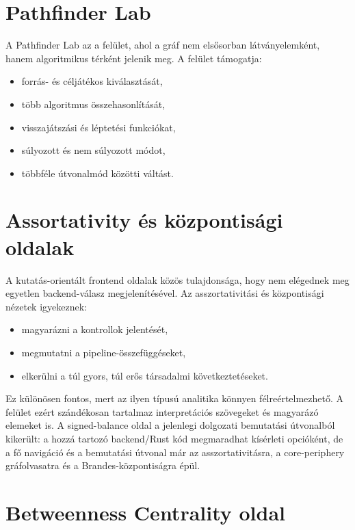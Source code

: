﻿\documentclass[a4paper,12pt]{report}
\begin{document}
\section{Pathfinder Lab}

A Pathfinder Lab az a felület, ahol a gráf nem elsősorban látványelemként, hanem algoritmikus térként jelenik meg. A felület támogatja:

\begin{itemize}
    \item forrás- és céljátékos kiválasztását,
    \item több algoritmus összehasonlítását,
    \item visszajátszási és léptetési funkciókat,
    \item súlyozott és nem súlyozott módot,
    \item többféle útvonalmód közötti váltást.
\end{itemize}

\section{Assortativity és központisági oldalak}

A kutatás-orientált frontend oldalak közös tulajdonsága, hogy nem elégednek meg egyetlen backend-válasz megjelenítésével. Az asszortativitási és központisági nézetek igyekeznek:

\begin{itemize}
    \item magyarázni a kontrollok jelentését,
    \item megmutatni a pipeline-összefüggéseket,
    \item elkerülni a túl gyors, túl erős társadalmi következtetéseket.
\end{itemize}

Ez különösen fontos, mert az ilyen típusú analitika könnyen félreértelmezhető. A felület ezért szándékosan tartalmaz interpretációs szövegeket és magyarázó elemeket is. A signed-balance oldal a jelenlegi dolgozati bemutatási útvonalból kikerült: a hozzá tartozó backend/Rust kód megmaradhat kísérleti opcióként, de a fő navigáció és a bemutatási útvonal már az asszortativitásra, a core-periphery gráfolvasatra és a Brandes-központiságra épül.

\section{Betweenness Centrality oldal}
\end{document}
